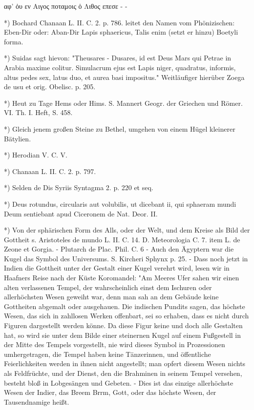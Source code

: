 \documentclass[a4paper, 11pt, oneside, polutonikogreek, german]{article}
\begin{document}
αφ' ὁυ εν Αιγος ποταμοις
ὁ Λιθος επεσε - -

*) Bochard Chanaan L. II. C. 2. p. 786. leitet den Namen vom Phönizischen: Eben-Dir oder: Aban-Dir Lapis sphaericus, Talis enim (setzt er hinzu) Boetyli forma.

*) Suidas sagt hievon: "Theusares - Dusares, id est Deus Mars qui Petrae in Arabia maxime colitur. Simulacrum ejus est Lapis niger, quadratus, informis, altus pedes sex, latus duo, et aurea basi impositus." Weitläufiger hierüber Zoega de usu et orig. Obelisc. p. 205.

*) Heut zu Tage Hems oder Hims. S. Mannert Geogr. der Griechen und Römer. VI. Th. I. Heft, S. 458.

*) Gleich jenem großen Steine zu Bethel, umgehen von einem Hügel kleinerer Bätylien.

*) Herodian V. C. V.

*) Chanaan L. II. C. 2. p. 797.

*) Selden de Dis Syriis Syntagma 2. p. 220 et seq.

*) Deus rotundus, circularis aut volubilis, ut dicebant ii, qui sphaeram mundi Deum sentiebant apud Ciceronem de Nat. Deor. II.

*) Von der sphärischen Form des Alls, oder der Welt, und dem Kreise als Bild der Gottheit s. Aristoteles de mundo L. II. C. 14. D. Meteorologia C. 7. item L. de Zeone et Gorgia. - Plutarch de Plac. Phil. C. 6 - Auch den Ägyptern war die Kugel das Symbol des Universums. S. Kircheri Sphynx p. 25. - Dass noch jetzt in Indien die Gottheit unter der Gestalt einer Kugel verehrt wird, lesen wir in Haafners Reise nach der Küste Koromandel:
"Am Meeres Ufer sahen wir einen alten verlassenen Tempel, der wahrscheinlich einst dem Ischuren oder allerhöchsten Wesen geweiht war, denn man sah an dem Gebäude keine Gottheiten abgemalt oder ausgehauen. Die indischen Pundits sagen, das höchste Wesen, das sich in zahllosen Werken offenbart, sei so erhaben, dass es nicht durch Figuren dargestellt werden könne. Da diese Figur keine und doch alle Gestalten hat, so wird sie unter dem Bilde einer steinernen Kugel auf einem Fußgestell in der Mitte des Tempels vorgestellt, nie wird dieses Symbol in Prozessionen umhergetragen, die Tempel haben keine Tänzerinnen, und öffentliche Feierlichkeiten werden in ihnen nicht angestellt; man opfert diesem Wesen nichts als Feldfrüchte, und der Dienst, den die Brahminen in seinem Tempel versehen, besteht bloß in Lobgesängen und Gebeten. - Dies ist das einzige allerhöchste Wesen der Indier, das Breem Brrm, Gott, oder das höchste Wesen, der Tausendnamige heißt.
\end{document}
